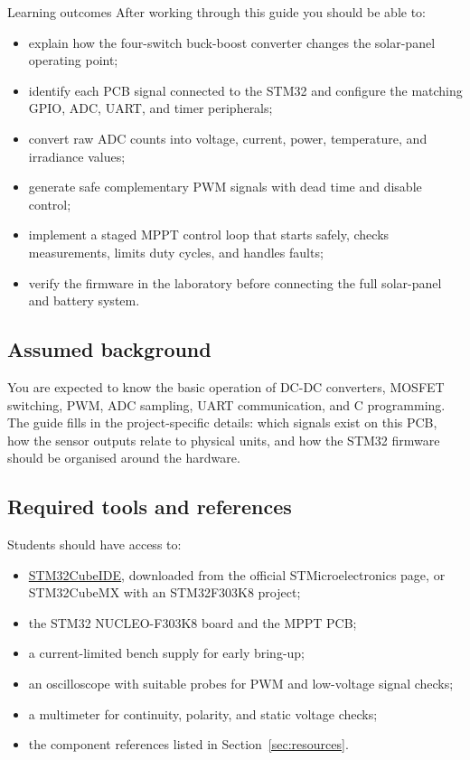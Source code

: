 \documentclass[11pt,a4paper]{article}
\begin{document}
\begin{guidebox}{Learning outcomes}
After working through this guide you should be able to:
\begin{itemize}
  \item explain how the four-switch buck-boost converter changes the solar-panel operating point;
  \item identify each PCB signal connected to the STM32 and configure the matching GPIO, ADC, UART, and timer peripherals;
  \item convert raw ADC counts into voltage, current, power, temperature, and irradiance values;
  \item generate safe complementary PWM signals with dead time and disable control;
  \item implement a staged MPPT control loop that starts safely, checks measurements, limits duty cycles, and handles faults;
  \item verify the firmware in the laboratory before connecting the full solar-panel and battery system.
\end{itemize}
\end{guidebox}

\subsection{Assumed background}

You are expected to know the basic operation of DC-DC converters, MOSFET switching, PWM, ADC sampling, UART communication, and C programming. The guide fills in the project-specific details: which signals exist on this PCB, how the sensor outputs relate to physical units, and how the STM32 firmware should be organised around the hardware.

\subsection{Required tools and references}

Students should have access to:
\begin{itemize}
  \item \href{https://www.st.com/en/development-tools/stm32cubeide}{STM32CubeIDE}, downloaded from the official STMicroelectronics page, or STM32CubeMX with an STM32F303K8 project;
  \item the STM32 NUCLEO-F303K8 board and the MPPT PCB;
  \item a current-limited bench supply for early bring-up;
  \item an oscilloscope with suitable probes for PWM and low-voltage signal checks;
  \item a multimeter for continuity, polarity, and static voltage checks;
  \item the component references listed in Section~\ref{sec:resources}.
\end{itemize}
\end{document}

